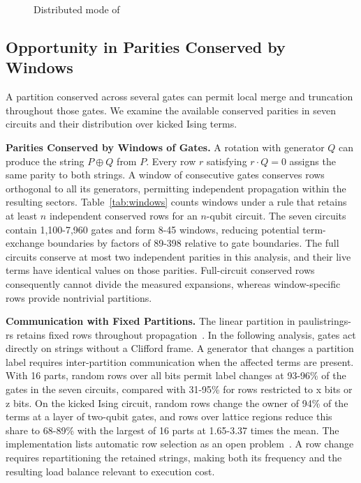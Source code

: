 \begin{figure}[t]
\centering
{}\hfill
{}\hfill
{}
\caption{Distributed mode of \cuPP}
\label{fig:anatomy}
\end{figure}

\subsection{Opportunity in Parities Conserved by Windows}
A partition conserved across several gates can permit local merge and truncation throughout those gates.
We examine the available conserved parities in seven circuits and their distribution over kicked Ising terms.

\noindent\textbf{Parities Conserved by Windows of Gates.}
A rotation with generator $Q$ can produce the string $P\oplus Q$ from $P$.
Every row $r$ satisfying $r\cdot Q=0$ assigns the same parity to both strings.
A window of consecutive gates conserves rows orthogonal to all its generators, permitting independent propagation within the resulting sectors.
Table~\ref{tab:windows} counts windows under a rule that retains at least $n$ independent conserved rows for an $n$-qubit circuit.
The seven circuits contain 1,100-7,960 gates and form 8-45 windows, reducing potential term-exchange boundaries by factors of 89-398 relative to gate boundaries.
The full circuits conserve at most two independent parities in this analysis, and their live terms have identical values on those parities.
Full-circuit conserved rows consequently cannot divide the measured expansions, whereas window-specific rows provide nontrivial partitions.

\noindent\textbf{Communication with Fixed Partitions.}
The linear partition in paulistrings-rs retains fixed rows throughout propagation~\cite{paulistrings}.
In the following analysis, gates act directly on strings without a Clifford frame.
A generator that changes a partition label requires inter-partition communication when the affected terms are present.
With 16 parts, random rows over all bits permit label changes at 93-96\% of the gates in the seven circuits, compared with 31-95\% for rows restricted to x bits or z bits.
On the kicked Ising circuit, random rows change the owner of 94\% of the terms at a layer of two-qubit gates, and rows over lattice regions reduce this share to 68-89\% with the largest of 16 parts at 1.65-3.37 times the mean.
The implementation lists automatic row selection as an open problem~\cite{paulistrings}.
A row change requires repartitioning the retained strings, making both its frequency and the resulting load balance relevant to execution cost.

